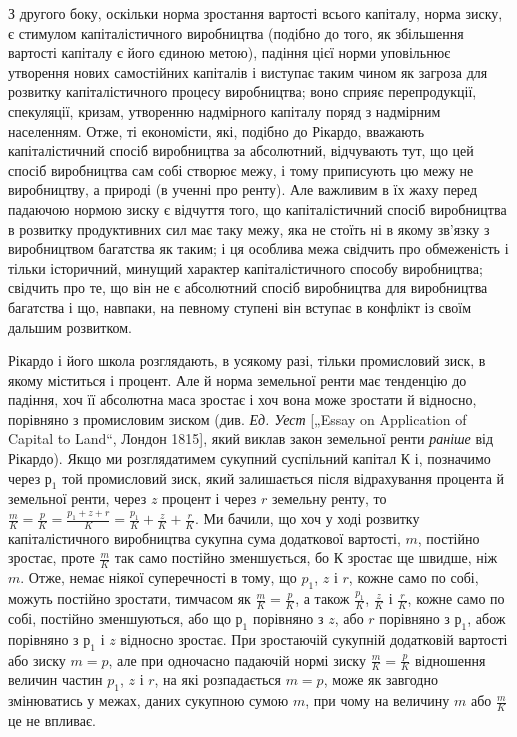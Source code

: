 З другого боку, оскільки норма зростання вартості всього капіталу, норма зиску, є стимулом
капіталістичного виробництва (подібно до того, як збільшення вартості капіталу є його єдиною метою),
падіння цієї норми уповільнює утворення нових самостійних капіталів і виступає таким чином як
загроза для розвитку капіталістичного процесу виробництва; воно сприяє перепродукції, спекуляції,
кризам, утворенню надмірного капіталу поряд з надмірним населенням. Отже, ті економісти, які,
подібно до Рікардо, вважають капіталістичний спосіб виробництва за абсолютний, відчувають тут, що
цей спосіб виробництва сам собі створює межу, і тому приписують цю межу не виробництву, а природі (в
ученні про ренту). Але важливим в їх жаху перед падаючою нормою зиску є відчуття того, що
капіталістичний спосіб виробництва в розвитку продуктивних сил має таку межу, яка не стоїть ні в
якому зв’язку з виробництвом багатства як таким;
і ця особлива межа свідчить про обмеженість і тільки
історичний, минущий характер капіталістичного способу виробництва;
свідчить про те, що він не є абсолютний спосіб виробництва
для виробництва багатства і що, навпаки, на певному
ступені він вступає в конфлікт із своїм дальшим розвитком.

Рікардо і його школа розглядають, в усякому разі, тільки промисловий
зиск, в якому міститься і процент. Але й норма земельної
ренти має тенденцію до падіння, хоч її абсолютна маса зростає
і хоч вона може зростати й відносно, порівняно з промисловим
зиском (див. \emph{Ед. Уест} [„Essay on Application of Capital to Land“,
Лондон 1815], який виклав закон земельної ренти \emph{раніше} від
Рікардо). Якщо ми розглядатимем сукупний суспільний капітал
$К$ і, позначимо через $р_1$ той промисловий зиск, який залишається
після відрахування процента й земельної ренти, через $z$
процент і через $r$ земельну ренту, то
$\frac{m}{K} = \frac{p}{K} = \frac{p_1 + z + r}{K} = \frac{p_1}{K} + \frac{z}{K} + \frac{r}{K}$.
Ми бачили, що хоч у ході розвитку капіталістичного
виробництва сукупна сума додаткової вартості, $m$, постійно
зростає, проте $\frac{m}{K}$ так само постійно зменшується, бо $К$
зростає ще швидше, ніж $m$. Отже, немає ніякої суперечності
в тому, що $p_1$, $z$ і $r$, кожне само по собі, можуть постійно зростати,
тимчасом як $\frac{m}{K} = \frac{p}{K}$, а також $\frac{p_1}{K}$, $\frac{z}{K}$ і $\frac{r}{K}$, кожне само
по собі, постійно зменшуються, або що $р_1$ порівняно з $z$, або
$r$ порівняно з $р_1$, абож порівняно з $р_1$ і $z$ відносно зростає.
При зростаючій сукупній додатковій вартості або зиску $m = p$, але
при одночасно падаючій нормі зиску $\frac{m}{K} = \frac{p}{K}$ відношення величин
частин $p_1$, $z$ і $r$, на які розпадається $m = p$, може як завгодно
змінюватись у межах, даних сукупною сумою $m$, при чому
на величину $m$ або $\frac{m}{K}$ це не впливає.


